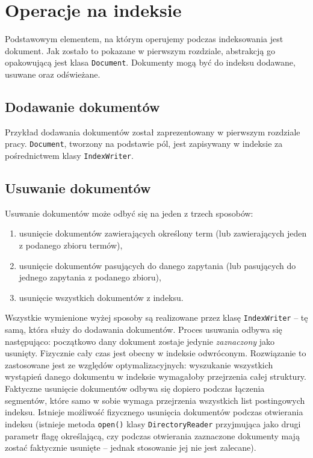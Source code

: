\chapter{Operacje na indeksie}

Podstawowym elementem, na którym operujemy podczas indeksowania jest dokument. Jak zostało to pokazane w pierwszym rozdziale, abstrakcją go opakowującą jest klasa \texttt{Document}. Dokumenty mogą być do indeksu dodawane, usuwane oraz odświeżane.

\section{Dodawanie dokumentów}

Przykład dodawania dokumentów został zaprezentowany w pierwszym rozdziale pracy. \texttt{Document}, tworzony na podstawie pól, jest zapisywany w indeksie za pośrednictwem klasy \texttt{IndexWriter}.

\section{Usuwanie dokumentów}

Usuwanie dokumentów może odbyć się na jeden z trzech sposobów: 
\begin{enumerate}
 \item usunięcie dokumentów zawierających określony term (lub zawierających jeden z podanego zbioru termów),
 \item usunięcie dokumentów pasujących do danego zapytania (lub pasujących do jednego zapytania z podanego zbioru),
 \item usunięcie wszystkich dokumentów z indeksu.
\end{enumerate}

Wszystkie wymienione wyżej sposoby są realizowane przez klasę \texttt{IndexWriter} -- tę samą, która służy do dodawania dokumentów. Proces usuwania odbywa się następująco: początkowo dany dokument zostaje jedynie \emph{zaznaczony} jako usunięty. Fizycznie cały czas jest obecny w indeksie odwróconym. Rozwiązanie to zastosowane jest ze względów optymalizacyjnych: wyszukanie wszystkich wystąpień danego dokumentu w indeksie wymagałoby przejrzenia całej struktury. Faktyczne usunięcie dokumentów odbywa się dopiero podczas łączenia segmentów, które samo w sobie wymaga przejrzenia wszystkich list postingowych indeksu. Istnieje możliwość fizycznego usunięcia dokumentów podczas otwierania indeksu (istnieje metoda \texttt{open()} klasy \texttt{DirectoryReader} przyjmująca jako drugi parametr flagę określającą, czy podczas otwierania zaznaczone dokumenty mają zostać faktycznie usunięte -- jednak stosowanie jej nie jest zalecane).

